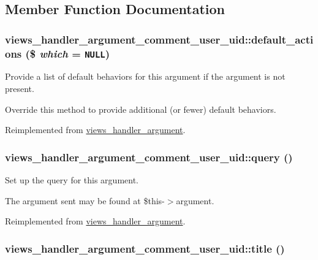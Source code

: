 \subsection{Member Function Documentation}
\hypertarget{classviews__handler__argument__comment__user__uid_492e0d7daafffc95f6ac936111556559}{
\subsubsection[{default\_\-actions}]{\setlength{\rightskip}{0pt plus 5cm}views\_\-handler\_\-argument\_\-comment\_\-user\_\-uid::default\_\-actions (\$ {\em which} = {\tt NULL})}}
\label{classviews__handler__argument__comment__user__uid_492e0d7daafffc95f6ac936111556559}


Provide a list of default behaviors for this argument if the argument is not present.

Override this method to provide additional (or fewer) default behaviors. 

Reimplemented from \hyperlink{classviews__handler__argument_bf38ef334b6e18e0aa43e5a829e3ce33}{views\_\-handler\_\-argument}.\hypertarget{classviews__handler__argument__comment__user__uid_081c8766297cd7051693061f32207709}{
\subsubsection[{query}]{\setlength{\rightskip}{0pt plus 5cm}views\_\-handler\_\-argument\_\-comment\_\-user\_\-uid::query ()}}
\label{classviews__handler__argument__comment__user__uid_081c8766297cd7051693061f32207709}


Set up the query for this argument.

The argument sent may be found at \$this-$>$argument. 

Reimplemented from \hyperlink{classviews__handler__argument_c4b0ce6704a10f515b2aea2f9e790994}{views\_\-handler\_\-argument}.\hypertarget{classviews__handler__argument__comment__user__uid_4e106a92bbbdb88e1207fe525480c18b}{
\subsubsection[{title}]{\setlength{\rightskip}{0pt plus 5cm}views\_\-handler\_\-argument\_\-comment\_\-user\_\-uid::title ()}}
\label{classviews__handler__argument__comment__user__uid_4e106a92bbbdb88e1207fe525480c18b}


